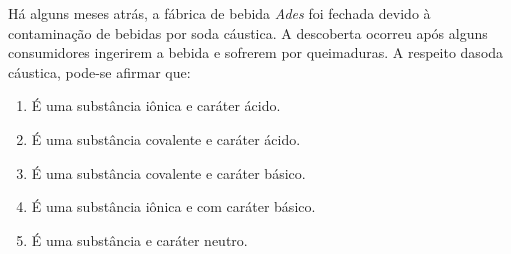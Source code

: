 Há alguns meses atrás, a fábrica de bebida \textit{Ades} foi fechada devido à contaminação de bebidas por soda cáustica.
A descoberta ocorreu após alguns consumidores ingerirem a bebida e sofrerem por queimaduras.
A respeito dasoda cáustica, pode-se afirmar que:

\begin{enumerate}[label = (\alph*)]
	\item É uma substância iônica e caráter ácido.
	\item É uma substância covalente e caráter ácido.
	\item É uma substância covalente e caráter básico.
	\item É uma substância iônica e com caráter básico.
	\item É uma substância e caráter neutro.
\end{enumerate}
